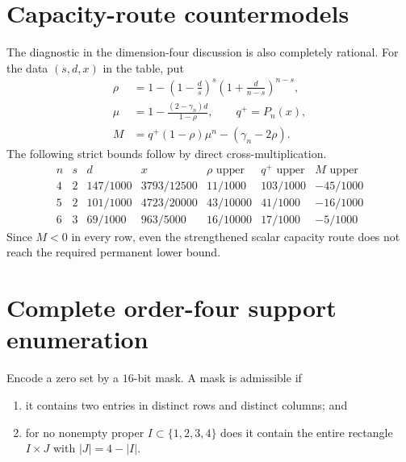 \documentclass[10pt,a4paper]{amsart}
\theoremstyle{definition}
\theoremstyle{remark}
\newenvironment{exacttable}
  {\begingroup\small
   \setlength{\arraycolsep}{4pt}%
   \renewcommand{\arraystretch}{1.12}}
  {\endgroup}
\begin{document}
\section{Capacity-route countermodels}
\label{app:capacity-controls}

The diagnostic in the dimension-four discussion is also completely
rational.  For the data \((s,d,x)\) in the table, put
\[
\begin{split}
\rho&=1-\left(1-\frac ds\right)^s
          \left(1+\frac d{n-s}\right)^{n-s},\\
\mu&=1-\frac{(2-\gamma_n)d}{1-\rho},\qquad
q^+=P_n(x),\\
M&=q^+(1-\rho)\mu^n-(\gamma_n-2\rho).
\end{split}
\]
The following strict bounds follow by direct cross-multiplication.
\begin{exacttable}
\[
\begin{array}{c|c|c|c|c|c|c}
n&s&d&x&\rho\text{ upper}&q^+\text{ upper}&M\text{ upper}\\ \hline
4&2&147/1000&3793/12500&11/1000&103/1000&-45/1000\\
5&2&101/1000&4723/20000&43/10000&41/1000&-16/1000\\
6&3&69/1000&963/5000&16/10000&17/1000&-5/1000
\end{array}
\tag{C.1}
\]
\end{exacttable}
Since \(M<0\) in every row, even the strengthened scalar capacity route
does not reach the required permanent lower bound.


\section{Complete order-four support enumeration}
\label{app:support-enumeration}

Encode a zero set by a \(16\)-bit mask.  A mask is admissible if

\begin{enumerate}
\item it contains two entries in distinct rows and distinct columns; and
\item for no nonempty proper \(I\subset\{1,2,3,4\}\) does it contain the
  entire rectangle \(I\times J\) with \(|J|=4-|I|\).
\end{enumerate}
\end{document}
